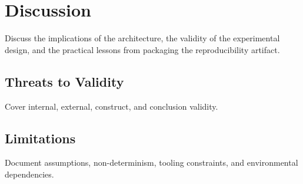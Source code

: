 \section{Discussion}

Discuss the implications of the architecture, the validity of the experimental
design, and the practical lessons from packaging the reproducibility artifact.

\subsection{Threats to Validity}

Cover internal, external, construct, and conclusion validity.

\subsection{Limitations}

Document assumptions, non-determinism, tooling constraints, and environmental
dependencies.
